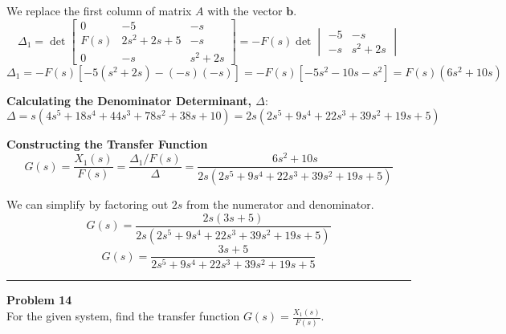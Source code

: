 \documentclass[11pt]{article}
\begin{document}
We replace the first column of matrix $A$ with the vector $\mathbf{b}$.
$$ \Delta_1 = \det
\begin{bmatrix}
0 & -5 & -s \\
F(s) & 2s^2 + 2s + 5 & -s \\
0 & -s & s^2 + 2s
\end{bmatrix}
= -F(s) \det \begin{vmatrix} -5 & -s \\ -s & s^2+2s \end{vmatrix} $$
$$ \Delta_1 = -F(s) [-5(s^2+2s) - (-s)(-s)] = -F(s)[-5s^2 - 10s - s^2] = F(s)(6s^2 + 10s)$$

\vspace{12pt}
\noindent\textbf{Calculating the Denominator Determinant, $\Delta$}:
$$\Delta = s(4s^5 + 18s^4 + 44s^3 + 78s^2 + 38s + 10) = 2s(2s^5 + 9s^4 + 22s^3 + 39s^2 + 19s + 5)$$

\vspace{12pt}
\noindent\textbf{Constructing the Transfer Function}
$$G(s) = \frac{X_1(s)}{F(s)} = \frac{\Delta_1 / F(s)}{\Delta} = \frac{6s^2 + 10s}{2s(2s^5 + 9s^4 + 22s^3 + 39s^2 + 19s + 5)}$$

We can simplify by factoring out $2s$ from the numerator and denominator.
$$G(s) = \frac{2s(3s + 5)}{2s(2s^5 + 9s^4 + 22s^3 + 39s^2 + 19s + 5)}$$
\[
\boxed{
G(s) = \frac{3s + 5}{2s^5 + 9s^4 + 22s^3 + 39s^2 + 19s + 5}
}
\]
\newpage
  \setcounter{page}{26}  
\noindent\rule{\textwidth}{1pt}
\noindent\textbf{Problem 14} \hfill 
\\ For the given system, find the transfer function $G(s)=\frac{X_1(s)}{F(s)}$.
\end{document}

